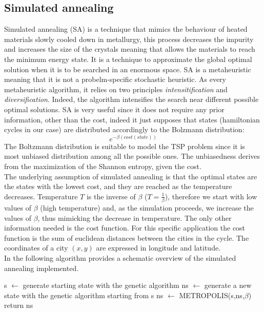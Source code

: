 \documentclass{article}
\begin{document}
\subsection{Simulated annealing}
Simulated annealing (SA) is a technique that mimics the behaviour of heated materials slowly cooled down in metallurgy, this process decreases the impurity and increases the size of the crystals meaning that allows the materials to reach the minimum energy state. It is a technique to approximate the global optimal solution when it is to be searched in an enormous space. SA is a metaheuristic meaning that it is not a probelm-specific stochastic heuristic. As every metaheuristic algorithm, it relies on two principles \textit{intensitification} and \textit{diversification}. Indeed, the algorithm intensifies the search near different possible optimal solutions.
SA is very useful since it does not require any prior information, other than the cost, indeed it just supposes that states (hamiltonian cycles in our case) are distributed accordingly to the Bolzmann distribution:
\begin{equation}
e^{- \beta (cost(state))}
\end{equation}
The Boltzmann distribution is suitable to model the TSP problem since it is most unbiased distribution among all the possible ones. The unbiasedness derives from the maximization of the Shannon entropy, given the cost.\\
The underlying assumption of simulated annealing is that the optimal states are the states with the lowest cost, and they are reached as the temperature decreases. Temperature $T$ is the inverse of $\beta$ ($T = \frac{1}{\beta}$), therefore we start with low values of $\beta$ (high temperature) and, as the simulation proceeds, we increase the values of $\beta$, thus mimicking the decrease in temperature.
The only other information needed is the cost function. For this specific application the cost function is the sum of euclidean distances between the cities in the cycle. The coordinates of a city $(x,y)$ are expressed in longitude and latitude.\\
In the following algorithm provides a schematic overview of the simulated annealing implemented.

\begin{algorithm}[H]
    \begin{algorithmic}[1]
        \State s $\leftarrow$ generate starting state with the genetic algorithm
         	 \State ns $\leftarrow$ generate a new state with the genetic algorithm starting from s
         	\State ns $\leftarrow$ METROPOLIS(s,ns,$\beta$)
         	\EndFor
        \EndFor
        \State return ns
       \EndFunction
\end{algorithmic}
\end{algorithm}
\end{document}
